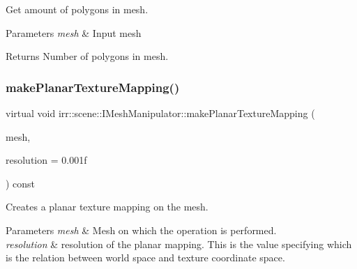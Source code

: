 Get amount of polygons in mesh. 


\begin{DoxyParams}{Parameters}
{\em mesh} & Input mesh \\
\hline
\end{DoxyParams}
\begin{DoxyReturn}{Returns}
Number of polygons in mesh. 
\end{DoxyReturn}
\mbox{\label{classirr_1_1scene_1_1IMeshManipulator_a82a3092d53e84e751bb13dac8dfa2ab4}} 
\subsubsection{\texorpdfstring{make\+Planar\+Texture\+Mapping()}{makePlanarTextureMapping()}\hspace{0.1cm}{\footnotesize\ttfamily [1/8]}}
{\footnotesize\ttfamily virtual void irr\+::scene\+::\+I\+Mesh\+Manipulator\+::make\+Planar\+Texture\+Mapping (\begin{DoxyParamCaption}\item[{\hyperlink{classirr_1_1scene_1_1IMesh}{I\+Mesh} $\ast$}]{mesh,  }\item[{\hyperlink{namespaceirr_a0277be98d67dc26ff93b1a6a1d086b07}{f32}}]{resolution = {\ttfamily 0.001f} }\end{DoxyParamCaption}) const\hspace{0.3cm}{\ttfamily [pure virtual]}}



Creates a planar texture mapping on the mesh. 


\begin{DoxyParams}{Parameters}
{\em mesh} & Mesh on which the operation is performed. \\
\hline
{\em resolution} & resolution of the planar mapping. This is the value specifying which is the relation between world space and texture coordinate space. \\
\hline
\end{DoxyParams}
\mbox{\label{classirr_1_1scene_1_1IMeshManipulator_a82a3092d53e84e751bb13dac8dfa2ab4}} 
